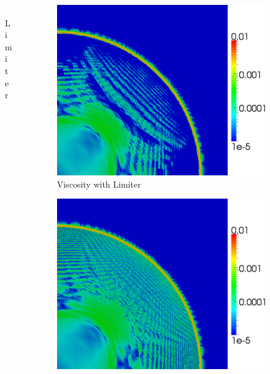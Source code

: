 \documentclass[8pt,xcolor=svgnames]{beamer}
\begin{document}
\begin{frame}
\begin{columns}
\begin{column}{0.3\textwidth}
\begin{figure}[t]
\begin{center}
\\Limiter
\end{center}
\end{figure}
\end{column}
\begin{column}{0.3\textwidth}
\begin{figure}[t]
\begin{center}
\includegraphics[height=0.9\textwidth]{figs/Sedov/Q2l-80-viscosity.png}
\\Viscosity with Limiter
\end{center}
\end{figure}
\begin{figure}[t]
\begin{center}
\includegraphics[height=0.9\textwidth]{figs/Sedov/Q2nl-80-viscosity.png}

\end{center}
\end{figure}
\end{column}
\end{columns}
\end{frame}
\end{document}
